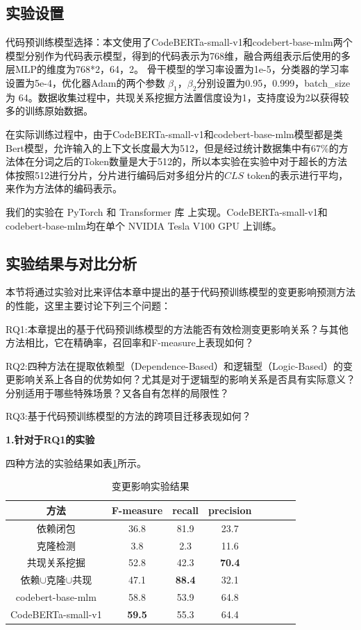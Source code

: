 \subsection{实验设置}

代码预训练模型选择：本文使用了CodeBERTa-small-v1和codebert-base-mlm两个模型分别作为代码表示模型，得到的代码表示为768维，融合两组表示后使用的多层MLP的维度为768*2，64，2。 骨干模型的学习率设置为1e-5，分类器的学习率设置为5e-4，优化器Adam的两个参数 $\beta_1$，$\beta_2$分别设置为0.95，0.999，batch\_size 为 64。数据收集过程中，共现关系挖掘方法置信度设为1，支持度设为2以获得较多的训练原始数据。

在实际训练过程中，由于CodeBERTa-small-v1和codebert-base-mlm模型都是类Bert模型，允许输入的上下文长度最大为512，但是经过统计数据集中有67\%的方法体在分词之后的Token数量是大于512的，所以本实验在实验中对于超长的方法体按照512进行分片，分片进行编码后对多组分片的$CLS$ token的表示进行平均，来作为方法体的编码表示。

我们的实验在 PyTorch 和 Transformer 库 上实现。CodeBERTa-small-v1和codebert-base-mlm均在单个 NVIDIA Tesla V100 GPU 上训练。


\subsection{实验结果与对比分析}

本节将通过实验对比来评估本章中提出的基于代码预训练模型的变更影响预测方法的性能，这里主要讨论下列三个问题：

RQ1:本章提出的基于代码预训练模型的方法能否有效检测变更影响关系？与其他方法相比，它在精确率，召回率和F-measure上表现如何？

RQ2:四种方法在提取依赖型（Dependence-Based）和逻辑型（Logic-Based）的变更影响关系上各自的优势如何？尤其是对于逻辑型的影响关系是否具有实际意义？分别适用于哪些特殊场景？又各自有怎样的局限性？

RQ3:基于代码预训练模型的方法的跨项目迁移表现如何？

\textbf{1.针对于RQ1的实验}

四种方法的实验结果如表\ref{1_变更影响实验结果}所示。


\begin{table}[htbp]
\caption{变更影响实验结果}
\label{1_变更影响实验结果}
\vspace{0.5em}\centering\wuhao
\begin{tabular}{cccccccc}
\toprule
方法 & F-measure & recall & precision  \\
\midrule
依赖闭包 & 36.8&81.9&23.7  \\
克隆检测 & 3.8&2.3&11.6 \\
共现关系挖掘 & 52.8&42.3&\textbf{70.4} \\
依赖$\cup$克隆$\cup$共现 & 47.1&\textbf{88.4}&32.1 \\
codebert-base-mlm & 58.8&53.9&64.8 \\
CodeBERTa-small-v1 & \textbf{59.5} & 55.3 & 64.4 \\
\bottomrule
\end{tabular}
\end{table}

